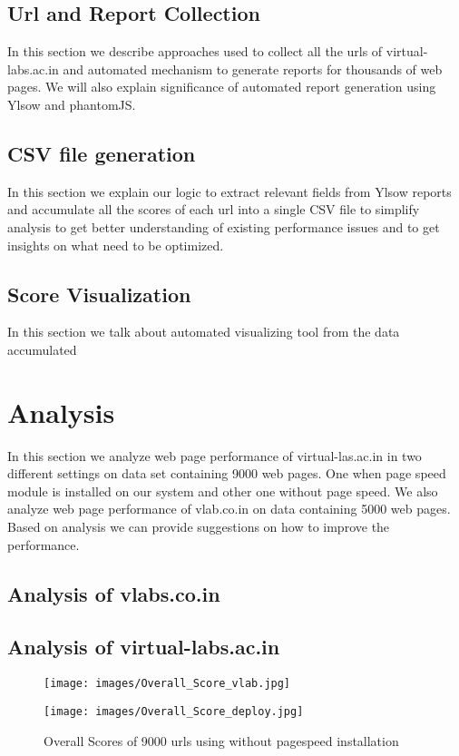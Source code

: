 \documentclass[a4paper,10pt]{IEEEtran}
\begin{document}
\subsection{Url and Report Collection}
In this section we describe approaches used to collect all the urls of virtual-labs.ac.in and automated mechanism to generate reports for
thousands of web pages. We will also explain significance of automated report generation using Ylsow and phantomJS.
\subsection{CSV file generation}
In this section we explain our logic to extract relevant fields from Ylsow reports and accumulate all the scores of each url into a single CSV file to
simplify analysis to get better understanding of existing performance issues and to get insights on what need to be optimized.
\subsection{Score Visualization}
In this section we talk about automated visualizing tool from the data accumulated 

\section{Analysis}
In this section we analyze web page performance of virtual-las.ac.in in two different settings on data set containing 9000 web pages.
One when page speed module is installed on our system and other one without page speed. We also analyze web page performance of vlab.co.in  
on data containing 5000 web pages. Based on analysis we can provide suggestions on how to improve the performance. 
\subsection{Analysis of vlabs.co.in}

\subsection{Analysis of virtual-labs.ac.in}
\begin{figure}[ht]
 \centering
\texttt{[image: images/Overall\_Score\_vlab.jpg]}
\caption{}
\label{fig1}
\end{figure}



\begin{figure}[ht]
 \centering
\texttt{[image: images/Overall\_Score\_deploy.jpg]}
\caption{Overall Scores of 9000 urls using without pagespeed installation}
\label{fig1}
\end{figure}
\end{document}
